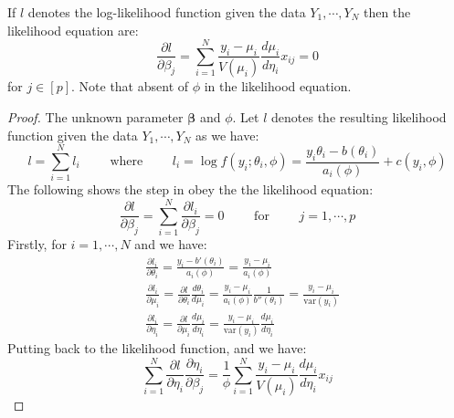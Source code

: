 \begin{proposition}
    If $l$ denotes the log-likelihood function given the data $Y_1,\cdots,Y_N$ then the likelihood equation are:
    \begin{equation*}
        \frac{\partial l}{\partial \beta_j} = \sum^N_{i=1}\frac{y_i-\mu_i}{V(\mu_i)}\frac{d\mu_i}{d\eta_i}x_{ij} = 0
    \end{equation*}
    for $j \in [p]$. Note that absent of $\phi$ in the likelihood equation. 
\end{proposition}
\begin{proof}
    The unknown parameter $\boldsymbol \beta$ and $\phi$. Let $l$ denotes the resulting likelihood function given the data $Y_1,\cdots,Y_N$ as we have:
    \begin{equation*}
        l = \sum^N_{i=1}l_i \qquad \text{ where } \qquad l_i = \log f(y_i;\theta_i, \phi) = \frac{y_i\theta_i - b(\theta_i)}{a_i(\phi)} + c(y_i, \phi)
    \end{equation*}
    The following shows the step in obey the the likelihood equation:
    \begin{equation*}
        \frac{\partial l}{\partial \beta_j} = \sum^N_{i=1}\frac{\partial l_i}{\partial \beta_j} = 0 \qquad \text{ for } \qquad j = 1,\cdots,p
    \end{equation*}
    Firstly, for $i=1,\cdots,N$ and we have:
    \begin{equation*}
    \begin{aligned}
        &\frac{\partial l_i}{\partial \theta_i} = \frac{y_i - b'(\theta_i)}{a_i(\phi)} = \frac{y_i-\mu_i}{a_i(\phi)} \\ 
        &\frac{\partial l_i}{\partial \mu_i} = \frac{\partial l}{\partial \theta_i}\frac{d \theta_i}{d\mu_i} = \frac{y_i-\mu_i}{a_i(\phi)}\frac{1}{b''(\theta_i)} = \frac{y_i-\mu_i}{\text{var}(y_i)} \\
        &\frac{\partial l_i}{\partial \eta_i} = \frac{\partial l}{\partial\mu_i}\frac{d\mu_i}{d\eta_i} = \frac{y_i-\mu_i}{\text{var}(y_i)} \frac{d\mu_i}{d\eta_i}
    \end{aligned}
    \end{equation*}
    Putting back to the likelihood function, and we have:
    \begin{equation*}
        \sum^N_{i=1}\frac{\partial l}{\partial \eta_i}\frac{\partial \eta_i}{\partial \beta_j} = \frac{1}{\phi}\sum^N_{i=1}\frac{y_i-\mu_i}{V(\mu_i)}\frac{d\mu_i}{d\eta_i}x_{ij}
    \end{equation*}
\end{proof}

